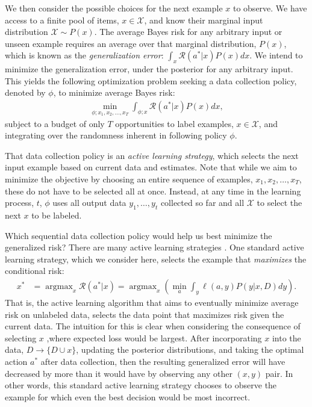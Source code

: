 \documentclass[nonblindrev]{informs3}
\newcommand{\risk}{\mathcal{R}}
\begin{document}
We then consider the possible choices for the next example $x$ to observe. We have access to a finite pool of items, $x \in \mathcal{X}$, and know their marginal input distribution $\mathcal{X} \sim P(x)$. The average Bayes risk for any arbitrary input or unseen example requires an average over that marginal distribution, $P(x)$, which is known as the \emph{generalization error}: $\int_x \risk(a^{*}|x) P(x)dx$. We intend to minimize the generalization error, under the posterior for any arbitrary input. This yields the following optimization problem seeking a data collection policy, denoted by $\phi$, to minimize average Bayes risk:
\begin{align}
\min_{\phi;x_1,x_2,\ldots,x_T} \int_{\phi;x} \risk(a^{*}|x) P(x)dx,
\end{align}
subject to a budget of only $T$ opportunities to label examples, $x \in \mathcal{X}$, and integrating over the randomness inherent in following policy  $\phi$. 

That data collection policy is an \emph{active learning strategy}, which selects the next input example based on current data and estimates. Note that while we aim to minimize the objective by choosing an entire sequence of examples, $x_1,x_2,\ldots,x_T$, these do not have to be selected all at once. Instead, at any time in the learning process, $t$, $\phi$ uses all output data $y_1,\ldots,y_t$ collected so far and all $\mathcal{X}$ to select the next $x$ to be labeled. 

Which sequential data collection policy would help us best minimize the generalized risk? There are many active learning strategies \citep{balcan2009agnostic,balcan2010true,dasgupta2008general,fu2013survey}. One standard active learning strategy, which we consider here, selects the example that \emph{maximizes} the conditional risk:
\begin{align}
x^{*}  &= \mathop{\text{arg}\max}_x \risk(a^{*}|x) 
= \mathop{\text{arg}\max}_{x} \left( \min_{a} \int_y \ell(a,y) P(y|x,D) dy \right).
\end{align}
That is, the active learning algorithm that aims to eventually minimize average risk on unlabeled data, selects the data point that maximizes risk given the current data.  The intuition for this is clear when considering the consequence of selecting $x$ ,where expected loss would be largest. After incorporating $x$ into the data, $D \to \{D \cup x \}$, updating the posterior distributions, and taking the optimal action $a^{*}$ after data collection, then the resulting generalized error will have decreased by more than it would have by observing any other $(x,y)$ pair. In other words, this standard active learning strategy chooses to observe the example for which even the best decision would be most incorrect. 
\end{document}
